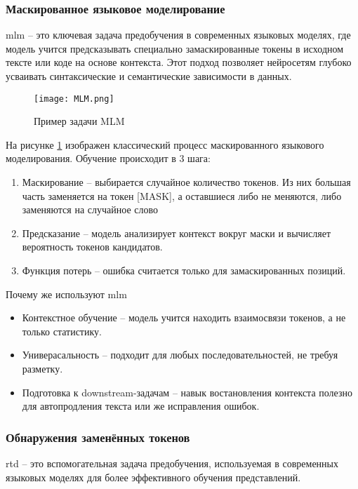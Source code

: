 \documentclass[../part_1.tex]{subfiles}
\begin{document}
\subsubsection{Маскированное языковое моделирование}
\par \acrfull{mlm} -- это ключевая задача предобучения в современных языковых моделях, где модель учится предсказывать специально замаскированные токены в исходном тексте или коде на основе контекста. Этот подход позволяет нейросетям глубоко усваивать синтаксические и семантические зависимости в данных.
\begin{figure}[h]
    \centering
    \texttt{[image: MLM.png]}
    \caption{Пример задачи MLM}
    \label{fig:mlm_bert}
\end{figure}
\par На рисунке \ref{fig:mlm_bert} изображен классический процесс маскированного языкового моделирования. Обучение происходит в 3 шага:
\begin{enumerate}
    \item Маскирование -- выбирается случайное количество токенов. Из них большая часть заменяется на токен [MASK], а оставшиеся либо не меняются, либо заменяются на случайное слово
    \item Предсказание -- модель анализирует контекст вокруг маски и вычисляет вероятность токенов кандидатов.
    \item Функция потерь -- ошибка считается только для замаскированных позиций.
\end{enumerate}
\par Почему же используют \acrshort{mlm}
\begin{itemize}
    \item Контекстное обучение -- модель учится находить взаимосвязи токенов, а не только статистику.
    \item Универасальность -- подходит для любых последовательностей, не требуя разметку.
    \item Подготовка к downstream-задачам -- навык востановления контекста полезно для автопродления текста или же исправления ошибок.
\end{itemize}

\subsubsection{Обнаружения заменённых токенов}
\par \acrfull{rtd} -- это вспомогательная задача предобучения, используемая в современных языковых моделях для более эффективного обучения представлений. 
\end{document}
